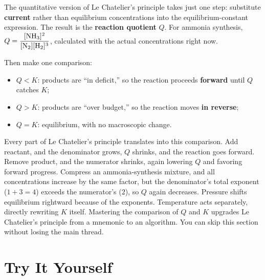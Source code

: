 \begin{tiaozhan}
The quantitative version of Le Chatelier's principle takes just one step: substitute \textbf{current} rather than equilibrium concentrations into the equilibrium-constant expression. The result is the \textbf{reaction quotient} $Q$. For ammonia synthesis, $Q=\dfrac{[\mathrm{NH_3}]^{2}}{[\mathrm{N_2}][\mathrm{H_2}]^{3}}$, calculated with the actual concentrations right now.

Then make one comparison:
\begin{itemize}[itemsep=2pt]
\item $Q<K$: products are ``in deficit,'' so the reaction proceeds \textbf{forward} until $Q$ catches $K$;
\item $Q>K$: products are ``over budget,'' so the reaction moves \textbf{in reverse};
\item $Q=K$: equilibrium, with no macroscopic change.
\end{itemize}
Every part of Le Chatelier's principle translates into this comparison. Add reactant, and the denominator grows, $Q$ shrinks, and the reaction goes forward. Remove product, and the numerator shrinks, again lowering $Q$ and favoring forward progress. Compress an ammonia-synthesis mixture, and all concentrations increase by the same factor, but the denominator's total exponent ($1+3=4$) exceeds the numerator's ($2$), so $Q$ again decreases. Pressure shifts equilibrium rightward because of the exponents. Temperature acts separately, directly rewriting $K$ itself. Mastering the comparison of $Q$ and $K$ upgrades Le Chatelier's principle from a mnemonic to an algorithm. You can skip this section without losing the main thread.
\end{tiaozhan}

\section*{Try It Yourself}

